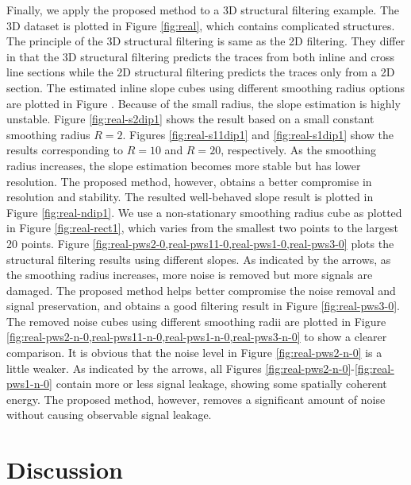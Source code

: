 Finally, we apply the proposed method to a 3D structural filtering example. The 3D dataset is plotted in Figure \ref{fig:real}, which contains complicated structures. The principle of the 3D structural filtering is same as the 2D filtering. They differ in that the 3D structural filtering predicts the traces from both inline and cross line sections while the 2D structural filtering predicts the traces only from a 2D section. The estimated inline slope cubes using different smoothing radius options are plotted in Figure \new{\ref{fig:real-s2dip1,real-s11dip1,real-s1dip1,real-ndip1,real-rect1}}. Because of the small radius, the slope estimation is highly unstable. Figure \ref{fig:real-s2dip1} shows the result based on a small constant smoothing radius $R=2$. Figures \ref{fig:real-s11dip1} and \ref{fig:real-s1dip1} show the results corresponding to $R=10$ and $R=20$, respectively. 
As the smoothing radius increases, the slope estimation becomes more stable but has lower resolution. The proposed method, however, obtains a better compromise in resolution and stability. The resulted well-behaved slope result is plotted in Figure \ref{fig:real-ndip1}. We use a non-stationary smoothing radius cube as plotted in Figure \ref{fig:real-rect1}, which varies from the smallest two points to the largest 20 points. Figure \ref{fig:real-pws2-0,real-pws11-0,real-pws1-0,real-pws3-0} plots the structural filtering results using different slopes. As indicated by the arrows, as the smoothing radius increases, more noise is removed but more signals are damaged. The proposed method helps better compromise the noise removal and signal preservation, and obtains a good filtering result in Figure \ref{fig:real-pws3-0}. The removed noise cubes using different smoothing radii are plotted in Figure \ref{fig:real-pws2-n-0,real-pws11-n-0,real-pws1-n-0,real-pws3-n-0} to show a clearer comparison. It is obvious that the noise level in Figure \ref{fig:real-pws2-n-0} is a little weaker. As indicated by the arrows, all Figures \ref{fig:real-pws2-n-0}-\ref{fig:real-pws1-n-0} contain more or less signal leakage, showing some spatially coherent energy. The proposed method, however, removes a significant amount of noise without causing observable signal leakage. 


\section{Discussion}

